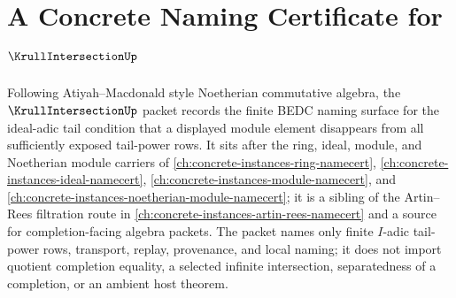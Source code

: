 \chapter{A Concrete Naming Certificate for $\KrullIntersectionUp$}
\label{ch:concrete-instances-krull-intersection-namecert}

Following Atiyah--Macdonald style Noetherian commutative algebra, the $\KrullIntersectionUp$ packet records the finite BEDC naming surface for the ideal-adic tail condition that a displayed module element disappears from all sufficiently exposed tail-power rows. It sits after the ring, ideal, module, and Noetherian module carriers of \autoref{ch:concrete-instances-ring-namecert}, \autoref{ch:concrete-instances-ideal-namecert}, \autoref{ch:concrete-instances-module-namecert}, and \autoref{ch:concrete-instances-noetherian-module-namecert}; it is a sibling of the Artin--Rees filtration route in \autoref{ch:concrete-instances-artin-rees-namecert} and a source for completion-facing algebra packets. The packet names only finite $I$-adic tail-power rows, transport, replay, provenance, and local naming; it does not import quotient completion equality, a selected infinite intersection, separatedness of a completion, or an ambient host theorem.

